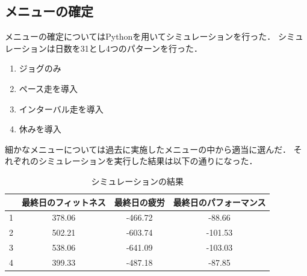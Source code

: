 \documentclass[12pt,fleqn]{jreport}
\begin{document}
\subsection{メニューの確定}
メニューの確定についてはPythonを用いてシミュレーションを行った．
シミュレーションは日数を31とし4つのパターンを行った．
\begin{enumerate}
  \item ジョグのみ
  \item ペース走を導入
  \item インターバル走を導入
  \item 休みを導入
\end{enumerate}
細かなメニューについては過去に実施したメニューの中から適当に選んだ．
それぞれのシミュレーションを実行した結果は以下の通りになった．
\begin{table}[H]
  \caption{シミュレーションの結果}
  \begin{center}
    \begin{tabular}{|c|c|c|c|}
      \hline
        & 最終日のフィットネス & 最終日の疲労 & 最終日のパフォーマンス \\
      \hline
      1 & 378.06               & -466.72      & -88.66                 \\
      \hline
      2 & 502.21               & -603.74      & -101.53                \\
      \hline
      3 & 538.06               & -641.09      & -103.03                \\
      \hline
      4 & 399.33               & -487.18      & -87.85                 \\
      \hline
    \end{tabular}
  \end{center}
\end{table}
\end{document}
